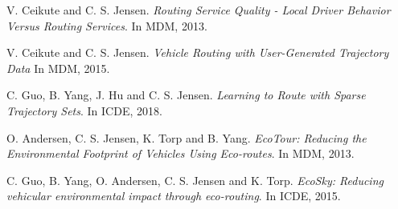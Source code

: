 \documentclass[11pt]{article}
\begin{document}
\begin{thebibliography}{15}
V. Ceikute and C. S. Jensen. \emph{Routing Service Quality - Local Driver Behavior Versus Routing Services}. In MDM, 2013.

V. Ceikute and C. S. Jensen. \emph{Vehicle Routing with User-Generated Trajectory Data} In MDM, 2015.

C. Guo, B. Yang, J. Hu and C. S. Jensen. \emph{Learning to Route with Sparse Trajectory Sets}. In  ICDE, 2018.

O. Andersen, C. S. Jensen, K. Torp and B. Yang. \emph{EcoTour: Reducing the Environmental Footprint of Vehicles Using Eco-routes}. In MDM, 2013.

C. Guo, B. Yang, O. Andersen, C. S. Jensen and K. Torp. \emph{EcoSky: Reducing vehicular environmental impact through eco-routing}. In ICDE, 2015.



\end{thebibliography}
\end{document}
